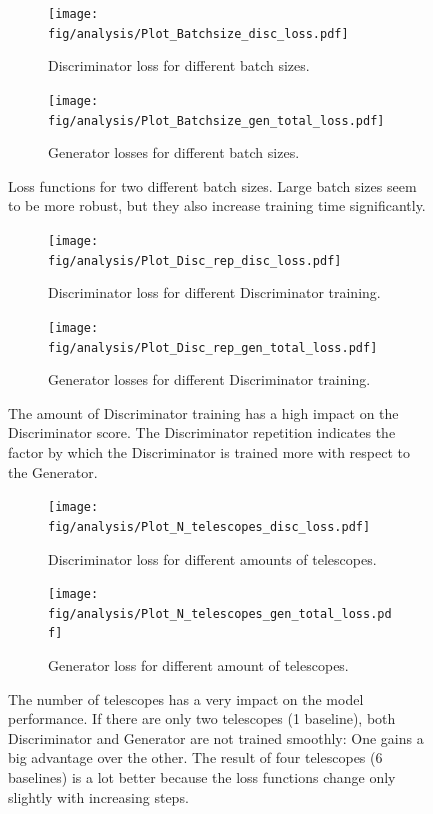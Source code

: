 \begin{figure}
	\centering
	\begin{subfigure}{0.5\linewidth}
		\centering
		\texttt{[image: fig/analysis/Plot\_Batchsize\_disc\_loss.pdf]}
		\caption{Discriminator loss for different batch sizes.}
		\label{fig:Plot_batchsize_discloss}
	\end{subfigure}\hfill
	\begin{subfigure}{0.5\linewidth}
		\centering
		\texttt{[image: fig/analysis/Plot\_Batchsize\_gen\_total\_loss.pdf]}
		\caption{Generator losses for different batch sizes.}
		\label{fig:Plot_batchsize_genloss}
	\end{subfigure}\hfill
	\caption{Loss functions for two different batch sizes. Large batch sizes seem to be more robust, but they also increase training time significantly. }
	\label{fig:Plot_batchsize_loss}
\end{figure}
\begin{figure}
	\centering
	\begin{subfigure}{0.5\linewidth}
		\centering
		\texttt{[image: fig/analysis/Plot\_Disc\_rep\_disc\_loss.pdf]}
		\caption{Discriminator loss for different Discriminator training.}
		\label{fig:Plot_discrep_discloss}
	\end{subfigure}\hfill
	\begin{subfigure}{0.5\linewidth}
		\centering
		\texttt{[image: fig/analysis/Plot\_Disc\_rep\_gen\_total\_loss.pdf]}
		\caption{Generator losses for different Discriminator training.}
		\label{fig:Plot_discrep_genloss}
	\end{subfigure}\hfill
	\caption{The amount of Discriminator training has a high impact on the Discriminator score. The Discriminator repetition indicates the factor by which the Discriminator is trained more with respect to the Generator.}
	\label{fig:Plot_discrep_loss}
\end{figure}
\begin{figure}
	\centering
	\begin{subfigure}{0.5\linewidth}
		\centering
		\texttt{[image: fig/analysis/Plot\_N\_telescopes\_disc\_loss.pdf]}
		\caption{Discriminator loss for different amounts of telescopes.}
		\label{fig:Plot_telescopes_discloss}
	\end{subfigure}\hfill
	\begin{subfigure}{0.5\linewidth}
		\centering
		\texttt{[image: fig/analysis/Plot\_N\_telescopes\_gen\_total\_loss.pdf]}
		\caption{Generator loss for different amount of telescopes.}
		\label{fig:Plot_telescopes_genloss}
	\end{subfigure}\hfill
	\caption{The number of telescopes has a very impact on the model performance. If there are only two telescopes (1 baseline), both Discriminator and Generator are not trained smoothly: One gains a big advantage over the other. The result of four telescopes (6 baselines) is a lot better because the loss functions change only slightly with increasing steps.}
	\label{fig:Plot_telescopes_loss}
\end{figure}

